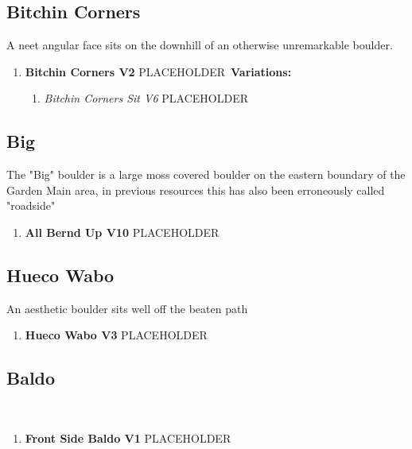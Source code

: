 \subsection*{Bitchin Corners}\label{bf:Bitchin Corners}
A neet angular face sits on the downhill of an otherwise unremarkable boulder.

\begin{enumerate}[]
	\item\label{rt:Bitchin Corners} \colorbox{green!20}{\textbf{Bitchin Corners V2  } }
	\newline PLACEHOLDER\
	\newline \textbf{Variations:}
	\begin{enumerate}
		\item\label{vr:Bitchin Corners Sit} \colorbox{RoyalBlue!20}{\emph{Bitchin Corners Sit V6  }  }
		\newline PLACEHOLDER\
	\end{enumerate}
\end{enumerate}
\subsection*{Big}\label{bf:Big}
The "Big" boulder is a large moss covered boulder on the eastern boundary of the Garden Main area, in previous resources this has also been erroneously called "roadside"

\begin{enumerate}[resume]
	\item\label{rt:All Bernd Up} \colorbox{red!20}{\textbf{All Bernd Up V10  } }
	\newline PLACEHOLDER\
\end{enumerate}
\subsection*{Hueco Wabo}\label{bf:Hueco Wabo}
An aesthetic boulder sits well off the beaten path

\begin{enumerate}[resume]
	\item\label{rt:Hueco Wabo} \colorbox{green!20}{\textbf{Hueco Wabo V3  } }
	\newline PLACEHOLDER\
\end{enumerate}
\subsection*{Baldo}\label{bf:Baldo}
\

\begin{enumerate}[resume]
	\item\label{rt:Front Side Baldo} \colorbox{green!20}{\textbf{Front Side Baldo V1  } }
	\newline PLACEHOLDER\
\end{enumerate}

